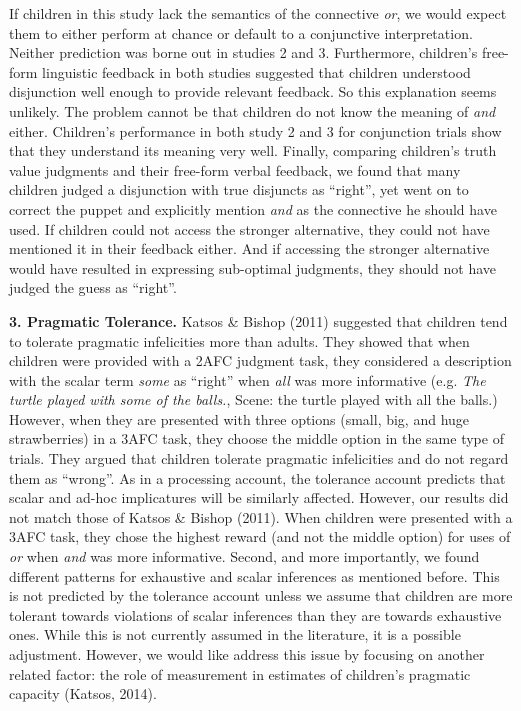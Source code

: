 \documentclass[,man,floatsintext]{apa6}
\begin{document}
If children in this study lack the semantics of the connective \emph{or}, we would expect them to either perform at chance or default to a conjunctive interpretation. Neither prediction was borne out in studies 2 and 3. Furthermore, children's free-form linguistic feedback in both studies suggested that children understood disjunction well enough to provide relevant feedback. So this explanation seems unlikely. The problem cannot be that children do not know the meaning of \emph{and} either. Children's performance in both study 2 and 3 for conjunction trials show that they understand its meaning very well. Finally, comparing children's truth value judgments and their free-form verbal feedback, we found that many children judged a disjunction with true disjuncts as \enquote{right}, yet went on to correct the puppet and explicitly mention \emph{and} as the connective he should have used. If children could not access the stronger alternative, they could not have mentioned it in their feedback either. And if accessing the stronger alternative would have resulted in expressing sub-optimal judgments, they should not have judged the guess as \enquote{right}.

\textbf{3. Pragmatic Tolerance.} Katsos \& Bishop (2011) suggested that children tend to tolerate pragmatic infelicities more than adults. They showed that when children were provided with a 2AFC judgment task, they considered a description with the scalar term \emph{some} as \enquote{right} when \emph{all} was more informative (e.g. \emph{The turtle played with some of the balls.}, Scene: the turtle played with all the balls.) However, when they are presented with three options (small, big, and huge strawberries) in a 3AFC task, they choose the middle option in the same type of trials. They argued that children tolerate pragmatic infelicities and do not regard them as \enquote{wrong}. As in a processing account, the tolerance account predicts that scalar and ad-hoc implicatures will be similarly affected. However, our results did not match those of Katsos \& Bishop (2011). When children were presented with a 3AFC task, they chose the highest reward (and not the middle option) for uses of \emph{or} when \emph{and} was more informative. Second, and more importantly, we found different patterns for exhaustive and scalar inferences as mentioned before. This is not predicted by the tolerance account unless we assume that children are more tolerant towards violations of scalar inferences than they are towards exhaustive ones. While this is not currently assumed in the literature, it is a possible adjustment. However, we would like address this issue by focusing on another related factor: the role of measurement in estimates of children's pragmatic capacity (Katsos, 2014).
\end{document}

